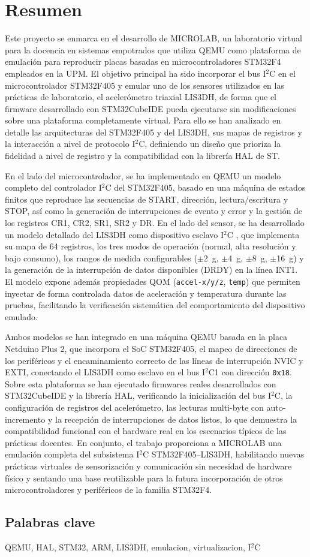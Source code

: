 \chapter*{Resumen}

Este proyecto se enmarca en el desarrollo de MICROLAB, un laboratorio virtual para 
la docencia en sistemas empotrados que utiliza QEMU como plataforma de emulación para 
reproducir placas basadas en microcontroladores STM32F4 empleados en la UPM. El 
objetivo principal ha sido incorporar el bus I$^2$C en el microcontrolador STM32F405 
y emular uno de los sensores utilizados en las prácticas de laboratorio, el 
acelerómetro triaxial LIS3DH, de forma que el firmware desarrollado con STM32CubeIDE 
pueda ejecutarse sin modificaciones sobre una plataforma completamente virtual. Para 
ello se han analizado en detalle las arquitecturas del STM32F405 y del LIS3DH, sus 
mapas de registros y la interacción a nivel de protocolo I$^2$C, definiendo un diseño 
que prioriza la fidelidad a nivel de registro y la compatibilidad con la librería HAL 
de ST.

En el lado del microcontrolador, se ha implementado en QEMU un modelo completo del 
controlador I$^2$C del STM32F405, basado en una máquina 
de estados finitos que reproduce las secuencias de START, dirección, lectura/escritura 
y STOP, así como la generación de interrupciones de evento y error y la 
gestión de los registros CR1, CR2, SR1, SR2 y DR. En el lado del sensor, se ha 
desarrollado un modelo detallado del LIS3DH como dispositivo esclavo I$^2$C 
, que implementa su mapa de 64 registros, los tres modos de 
operación (normal, alta resolución y bajo consumo), los rangos de medida 
configurables ($\pm$2~g, $\pm$4~g, $\pm$8~g, $\pm$16~g) y la generación de la 
interrupción de datos disponibles (DRDY) en la línea INT1. El modelo expone además 
propiedades QOM (\texttt{accel-x/y/z}, \texttt{temp}) que permiten inyectar de forma 
controlada datos de aceleración y temperatura durante las pruebas, facilitando la 
verificación sistemática del comportamiento del dispositivo emulado.

Ambos modelos se han integrado en una máquina QEMU basada en la placa Netduino Plus 2, 
que incorpora el SoC STM32F405, el mapeo de direcciones de los periféricos y el 
encaminamiento correcto de las líneas de interrupción NVIC y EXTI, conectando el 
LIS3DH como esclavo en el bus I$^2$C1 con dirección \texttt{0x18}. Sobre esta 
plataforma se han ejecutado firmwares reales desarrollados con STM32CubeIDE y la 
librería HAL, verificando la inicialización del bus I$^2$C, la configuración de 
registros del acelerómetro, las lecturas multi-byte con auto-incremento y la 
recepción de interrupciones de datos listos, lo que demuestra la compatibilidad 
funcional con el hardware real en los escenarios típicos de las prácticas docentes. 
En conjunto, el trabajo proporciona a MICROLAB una emulación completa del subsistema 
I$^2$C STM32F405--LIS3DH, habilitando nuevas prácticas virtuales de sensorización y 
comunicación sin necesidad de hardware físico y sentando una base reutilizable para la 
futura incorporación de otros microcontroladores y periféricos de la familia STM32F4.


\section*{Palabras clave}
QEMU, HAL, STM32, ARM, LIS3DH, emulacion, virtualizacion, I$^2$C

